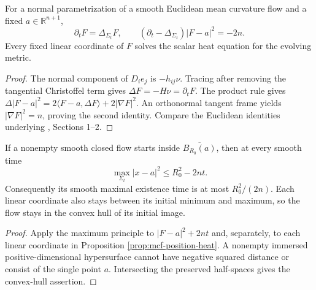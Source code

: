 \begin{proposition}\label{prop:mcf-position-heat}
For a normal parametrization of a smooth Euclidean mean curvature flow and a fixed $a\in\mathbb R^{n+1}$,
\[
 \partial_tF=\Delta_{\Sigma_t}F,\qquad
 (\partial_t-\Delta_{\Sigma_t})|F-a|^2=-2n.
\]
Every fixed linear coordinate of $F$ solves the scalar heat equation for the evolving metric.
\end{proposition}
\begin{proof}
The normal component of $D_ie_j$ is $-h_{ij}\nu$. Tracing after removing the tangential Christoffel term gives $\Delta F=-H\nu=\partial_tF$. The product rule gives
$\Delta|F-a|^2=2\langle F-a,\Delta F\rangle+2|\nabla F|^2$.
An orthonormal tangent frame yields $|\nabla F|^2=n$, proving the second identity. Compare the Euclidean identities underlying \cite{Hui90}, Sections 1--2.
\end{proof}

\begin{corollary}\label{cor:mcf-confinement}
If a nonempty smooth closed flow starts inside $\overline{B_{R_0}(a)}$, then at every smooth time
\[
 \max_{\Sigma_t}|x-a|^2\leq R_0^2-2nt.
\]
Consequently its smooth maximal existence time is at most $R_0^2/(2n)$. Each linear coordinate also stays between its initial minimum and maximum, so the flow stays in the convex hull of its initial image.
\end{corollary}
\begin{proof}
Apply the maximum principle to $|F-a|^2+2nt$ and, separately, to each linear coordinate in Proposition \ref{prop:mcf-position-heat}. A nonempty immersed positive-dimensional hypersurface cannot have negative squared distance or consist of the single point $a$. Intersecting the preserved half-spaces gives the convex-hull assertion.
\end{proof}

